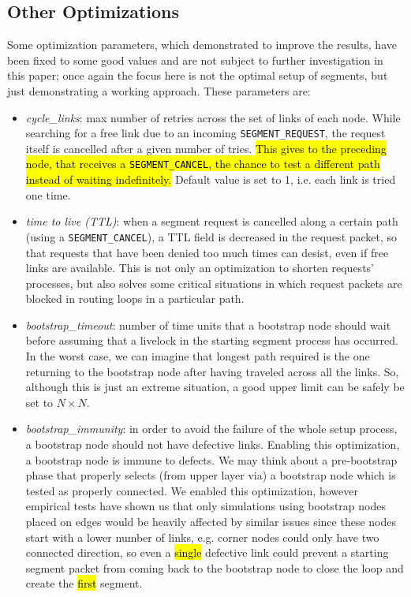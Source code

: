 \subsection{Other Optimizations}
Some optimization parameters, which demonstrated to improve the \disr{}
results, have been fixed to some good values and are not subject to
further investigation in this paper; once again the focus here is not the
optimal setup of segments, but just demonstrating a working approach. 
These parameters are:
\begin{itemize}
\item \emph{cycle\_links}: max number of retries across the set of links of
each node. While searching for a free link due to an incoming \texttt{SEGMENT\_REQUEST},
the request itself is cancelled after a given number of tries. \hl{This
gives to the preceding node, that receives a \texttt{SEGMENT\_CANCEL}, the
chance to test a different path instead of waiting indefinitely.}
Default value is set to 1, i.e. each link is tried one time.
\item \emph{time to live (TTL)}: when a segment request is cancelled
along a certain path (using a \texttt{SEGMENT\_CANCEL}), a TTL field is
decreased in the request packet, so that requests that have been
denied too much times can desist, even if free links are
available. This is not only an optimization to shorten
requests' processes, but also solves some critical situations in which
request packets are blocked in routing loops in a particular path.
\item \emph{bootstrap\_timeout}: number of time units that a bootstrap node
should wait before assuming that a livelock in the starting segment
process has occurred. In the worst case, we can imagine that longest
path required is the one returning to the bootstrap node after having
traveled across all the links. So, although this is just an extreme
situation, a good upper limit can be safely be set to $N \times N$.
\item \emph{bootstrap\_immunity}: in order to avoid the failure of the whole \disr{}
setup process, a bootstrap node should not have defective links.
Enabling this optimization, a bootstrap node is immune to defects.
We may think about a pre-bootstrap phase that properly selects (from upper
layer via) a bootstrap node which is tested as properly connected. We
enabled this optimization, however empirical tests have shown us that only
simulations using bootstrap nodes placed on edges would be heavily
affected by similar issues since these nodes start with a lower number of links,
e.g. corner nodes could only have two connected direction, so even a \hl{single}
defective link could prevent a starting segment packet from coming back to the
bootstrap node to close the loop and create the \hl{first} segment.
\end{itemize}
